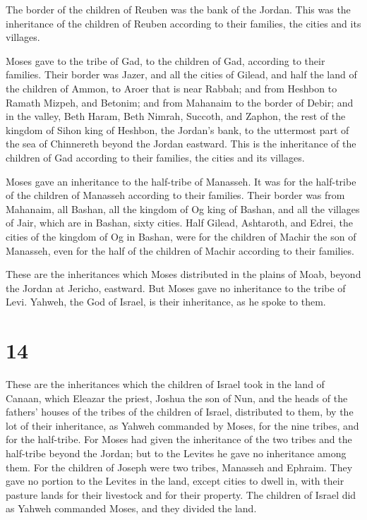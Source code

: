  The border of the children of Reuben was the bank of the
Jordan. This was the inheritance of the children of Reuben according to
their families, the cities and its villages.

 Moses gave to the tribe of Gad, to the children of Gad,
according to their families.  Their border was Jazer, and
all the cities of Gilead, and half the land of the children of Ammon, to
Aroer that is near Rabbah;  and from Heshbon to Ramath
Mizpeh, and Betonim; and from Mahanaim to the border of Debir;
 and in the valley, Beth Haram, Beth Nimrah, Succoth, and
Zaphon, the rest of the kingdom of Sihon king of Heshbon, the Jordan's
bank, to the uttermost part of the sea of Chinnereth beyond the Jordan
eastward.  This is the inheritance of the children of Gad
according to their families, the cities and its villages.

 Moses gave an inheritance to the half-tribe of Manasseh.
It was for the half-tribe of the children of Manasseh according to their
families.  Their border was from Mahanaim, all Bashan, all
the kingdom of Og king of Bashan, and all the villages of Jair, which
are in Bashan, sixty cities.  Half Gilead, Ashtaroth, and
Edrei, the cities of the kingdom of Og in Bashan, were for the children
of Machir the son of Manasseh, even for the half of the children of
Machir according to their families.

 These are the inheritances which Moses distributed in the
plains of Moab, beyond the Jordan at Jericho, eastward. 
But Moses gave no inheritance to the tribe of Levi. Yahweh, the God of
Israel, is their inheritance, as he spoke to them.

\hypertarget{section-13}{%
\section{14}\label{section-13}}

 These are the inheritances which the children of Israel
took in the land of Canaan, which Eleazar the priest, Joshua the son of
Nun, and the heads of the fathers' houses of the tribes of the children
of Israel, distributed to them,  by the lot of their
inheritance, as Yahweh commanded by Moses, for the nine tribes, and for
the half-tribe.  For Moses had given the inheritance of the
two tribes and the half-tribe beyond the Jordan; but to the Levites he
gave no inheritance among them.  For the children of Joseph
were two tribes, Manasseh and Ephraim. They gave no portion to the
Levites in the land, except cities to dwell in, with their pasture lands
for their livestock and for their property.  The children of
Israel did as Yahweh commanded Moses, and they divided the land.

